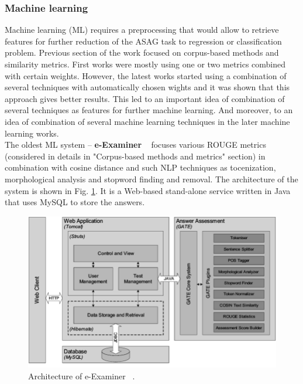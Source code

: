 \documentclass[11pt]{report}
\numberwithin{equation}{section} %
\begin{document}
\subsubsection{Machine learning}

Machine learning (ML) requires a preprocessing that would allow to retrieve features for further reduction of the ASAG task to regression or classification problem. Previous section of the work focused on corpus-based methods and similarity metrics. First works were mostly using one or two metrics combined with certain weights. However, the latest works started using a combination of several techniques with automatically chosen wights and it was shown that this approach gives better results. This led to an important idea of combination of several techniques as features for further machine learning. And moreover, to an idea of combination of several machine learning techniques in the later machine learning works. \\

The oldest ML system -- \textbf{e-Examiner} ~\cite{e-examiner} focuses various ROUGE metrics (considered in details in "Corpus-based methods and metrics" section) in combination with cosine distance and such NLP techniques as tocenization, morphological analysis and stopword finding and removal. The architecture of the system is shown in Fig. \ref{fig:e-examiner}. It is a  Web-based stand-alone service written in Java that uses MySQL to store the answers.\\


\begin{figure}[h!]
  \centering
  \includegraphics[width=\textwidth]{img/e-examiner}
    \caption{ Architecture of e-Examiner ~\cite{e-examiner}. }\label{fig:e-examiner}
\end{figure}
\end{document}
